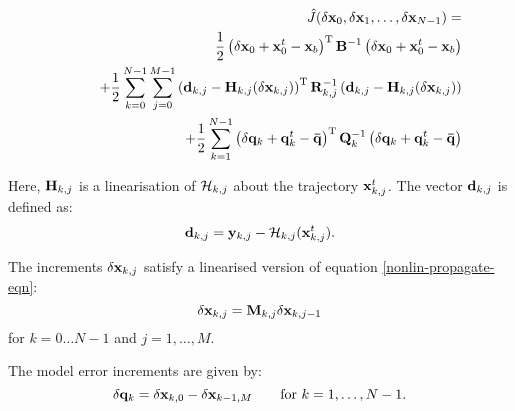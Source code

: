 \documentclass[12pt]{article}
\newcommand{\vect}[1]{{\bf #1}}                         %
\newcommand{\mat}[1]{{\bf #1}}                          %
\newcommand{\calH}{{\cal H}}                           %
\newcommand{\rmT}{{\rm T}}                           %
\begin{document}
\begin{eqnarray}
\label{cost-linear}
&&  {\hat J} ( \delta\vect{x}_0 , \delta\vect{x}_1 , \ldots ,
                                               \delta\vect{x}_{N-1} ) = \\
&&\qquad \phantom{+}
           \frac{1}{2} \left( \delta\vect{x}_0 + \vect{x}^t_0
                                              - \vect{x}_b \right)^\rmT
                      \mat{B}^{-1}
                       \left( \delta\vect{x}_0 + \vect{x}^t_0
                                              - \vect{x}_b \right) \nonumber \\
&&\qquad + \frac{1}{2} \sum_{k=0}^{N-1} \sum_{j=0}^{M-1}
             \left( \vect{d}_{k,j} - \mat{H}_{k,j} (\delta\vect{x}_{k,j} )
                                                        \right)^\rmT
                      \mat{R}_{k,j}^{-1}
             \left( \vect{d}_{k,j} - \mat{H}_{k,j} (\delta\vect{x}_{k,j} )
                                                        \right)
                        \nonumber \\
&&\qquad + \frac{1}{2} \sum_{k=1}^{N-1}
                       \left( \delta\vect{q}_k + \vect{q}^t_k
                                           - \vect{\bar q}  \right)^\rmT
                      \mat{Q}_k^{-1}
                       \left( \delta\vect{q}_k + \vect{q}^t_k
                                           - \vect{\bar q}  \right)
                        \nonumber
\end{eqnarray}

Here, $\mat{H}_{k,j}$ is a linearisation of $\calH_{k,j}$ about the
trajectory $\vect{x}^t_{k,j}$. The vector $\vect{d}_{k,j}$ is defined
as:
\begin{equation}
   \vect{d}_{k,j} = \vect{y}_{k,j} - \calH_{k,j} (\vect{x}^t_{k,j} ) .
\end{equation}

The increments $\delta\vect{x}_{k,j}$ satisfy a linearised version of equation
\ref{nonlin-propagate-eqn}:
\begin{equation}
   \label{linear-propagate-eqn}
   \delta\vect{x}_{k,j} = \vect{M}_{k,j} \delta\vect{x}_{k,j-1}
\end{equation}
for $k=0 \ldots N-1$ and $j=1 , \ldots , M$.

The model error increments are given by:
\begin{equation}
\label{linear-model-error-eqn}
   \delta\vect{q}_k = \delta\vect{x}_{k,0} - \delta\vect{x}_{k-1,M}
               \qquad\mbox{for $k=1 , \ldots , N-1$}.
\end{equation}
\end{document}
